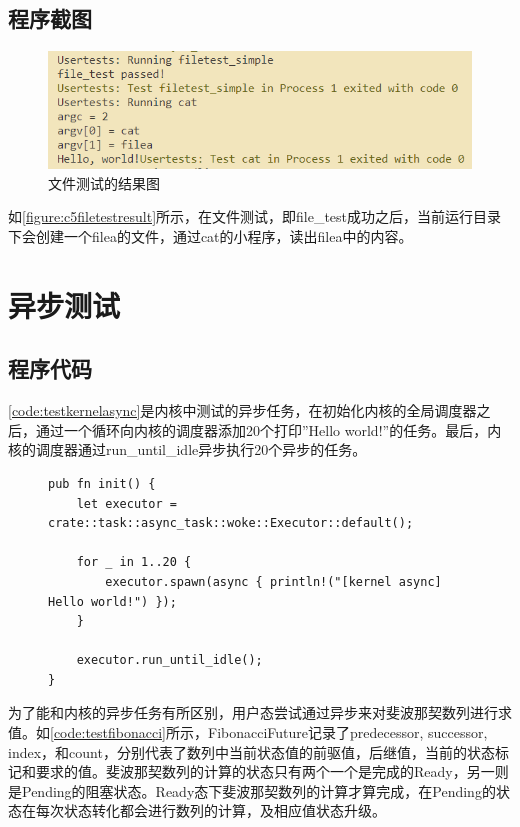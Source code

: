 \subsection{程序截图}
\begin{figure}[htb]
    \figureCapSet
    \centering
    \includegraphics[scale=0.5]{figure/c5/filetestresult.png}
    \caption{文件测试的结果图}
    \label{figure:c5filetestresult}
\end{figure}
如\autoref{figure:c5filetestresult}所示，在文件测试，即file\_test成功之后，当前运行目录下会创建一个filea的文件，通过cat的小程序，读出filea中的内容。
\section{异步测试}
\subsection{程序代码}
\autoref{code:testkernelasync}是内核中测试的异步任务，在初始化内核的全局调度器之后，通过一个循环向内核的调度器添加20个打印”Hello world!”的任务。最后，内核的调度器通过run\_until\_idle异步执行20个异步的任务。

\begin{figure}[h]
\begin{lstlisting}[caption=内核异步任务测试代码, label=code:testkernelasync]
pub fn init() {
    let executor = crate::task::async_task::woke::Executor::default();

    for _ in 1..20 {
        executor.spawn(async { println!("[kernel async] Hello world!") });
    }

    executor.run_until_idle();
}
\end{lstlisting}
\end{figure}

为了能和内核的异步任务有所区别，用户态尝试通过异步来对斐波那契数列进行求值。如\autoref{code:testfibonacci}所示，FibonacciFuture记录了predecessor, successor, index，和count，分别代表了数列中当前状态值的前驱值，后继值，当前的状态标记和要求的值。斐波那契数列的计算的状态只有两个一个是完成的Ready，另一则是Pending的阻塞状态。Ready态下斐波那契数列的计算才算完成，在Pending的状态在每次状态转化都会进行数列的计算，及相应值状态升级。


